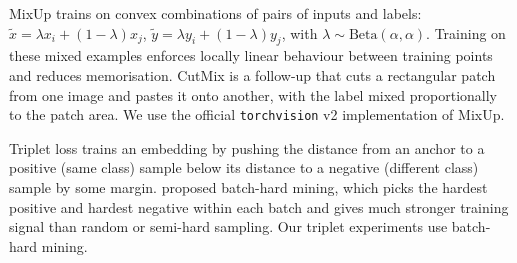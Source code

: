 MixUp \citep{zhang2018mixup} trains on convex combinations of pairs of inputs and labels: $\tilde{x} = \lambda x_i + (1-\lambda) x_j$, $\tilde{y} = \lambda y_i + (1-\lambda) y_j$, with $\lambda \sim \text{Beta}(\alpha, \alpha)$. Training on these mixed examples enforces locally linear behaviour between training points and reduces memorisation. CutMix \citep{yun2019cutmix} is a follow-up that cuts a rectangular patch from one image and pastes it onto another, with the label mixed proportionally to the patch area. We use the official \texttt{torchvision} v2 implementation of MixUp.

Triplet loss \citep{schroff2015facenet} trains an embedding by pushing the distance from an anchor to a positive (same class) sample below its distance to a negative (different class) sample by some margin. \citet{hermans2017triplet} proposed batch-hard mining, which picks the hardest positive and hardest negative within each batch and gives much stronger training signal than random or semi-hard sampling. Our triplet experiments use batch-hard mining.
